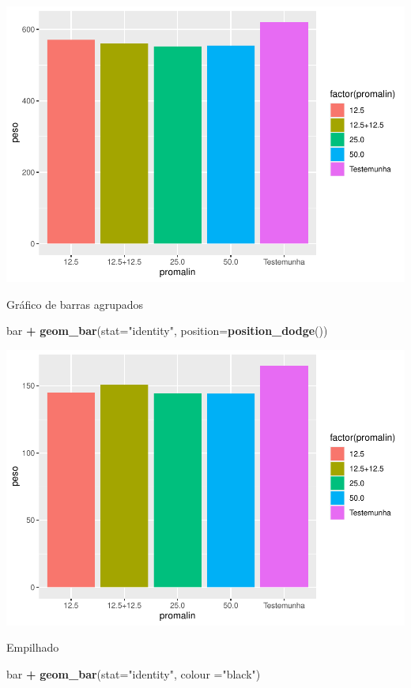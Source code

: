 \documentclass[]{book}
\newenvironment{Shaded}{\begin{snugshade}}{\end{snugshade}}
\newcommand{\DataTypeTok}[1]{\textcolor[rgb]{0.13,0.29,0.53}{#1}}
\newcommand{\KeywordTok}[1]{\textcolor[rgb]{0.13,0.29,0.53}{\textbf{#1}}}
\newcommand{\NormalTok}[1]{#1}
\newcommand{\OperatorTok}[1]{\textcolor[rgb]{0.81,0.36,0.00}{\textbf{#1}}}
\newcommand{\StringTok}[1]{\textcolor[rgb]{0.31,0.60,0.02}{#1}}
\begin{document}
\includegraphics{TudodoR_files/figure-latex/unnamed-chunk-197-1.pdf}

Gráfico de barras agrupados

\begin{Shaded}
\begin{Highlighting}[]
\NormalTok{bar }\OperatorTok{+}\StringTok{   }\KeywordTok{geom_bar}\NormalTok{(}\DataTypeTok{stat=}\StringTok{"identity"}\NormalTok{, }\DataTypeTok{position=}\KeywordTok{position_dodge}\NormalTok{())}
\end{Highlighting}
\end{Shaded}

\includegraphics{TudodoR_files/figure-latex/unnamed-chunk-198-1.pdf}

Empilhado

\begin{Shaded}
\begin{Highlighting}[]
\NormalTok{bar }\OperatorTok{+}\StringTok{   }\KeywordTok{geom_bar}\NormalTok{(}\DataTypeTok{stat=}\StringTok{"identity"}\NormalTok{, }\DataTypeTok{colour =}\StringTok{"black"}\NormalTok{)}
\end{Highlighting}
\end{Shaded}
\end{document}
